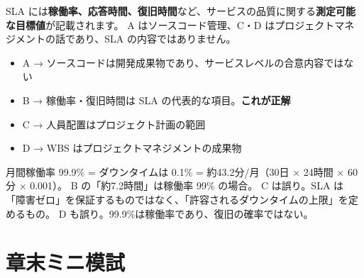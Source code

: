 \begin{kaisetsu}
SLA には\textbf{稼働率、応答時間、復旧時間}など、サービスの品質に関する\textbf{測定可能な目標値}が記載されます。
A はソースコード管理、C・D はプロジェクトマネジメントの話であり、SLA の内容ではありません。
\end{kaisetsu}
\begin{goutoubun}
\begin{itemize}
  \item A → ソースコードは開発成果物であり、サービスレベルの合意内容ではない
  \item B → 稼働率・復旧時間は SLA の代表的な項目。\textbf{これが正解}
  \item C → 人員配置はプロジェクト計画の範囲
  \item D → WBS はプロジェクトマネジメントの成果物
\end{itemize}
\end{goutoubun}

\begin{trickwarn}
月間稼働率 99.9\% = ダウンタイムは 0.1\% = 約43.2分/月（30日 × 24時間 × 60分 × 0.001）。
B の「約7.2時間」は稼働率 99\% の場合。
C は誤り。SLA は「障害ゼロ」を保証するものではなく、「許容されるダウンタイムの上限」を定めるもの。
D も誤り。99.9\%は稼働率であり、復旧の確率ではない。
\end{trickwarn}




\section*{章末ミニ模試}

